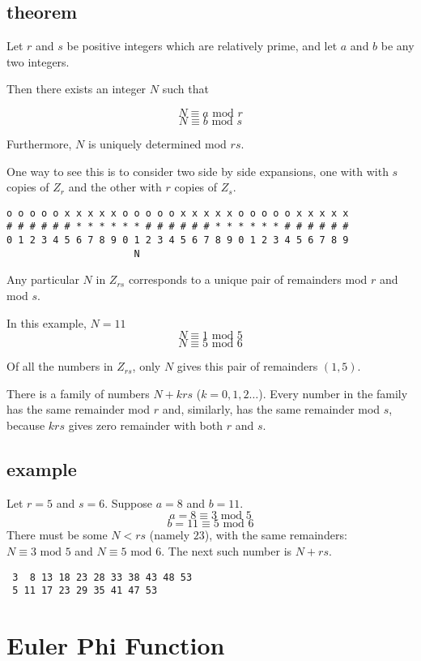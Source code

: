 \documentclass[11pt, oneside]{article}
\begin{document}
\subsection*{theorem}

Let $r$ and $s$ be positive integers which are relatively prime, and let $a$ and $b$ be any two integers.

Then there exists an integer $N$ such that

\[ N \equiv a \text{ mod } r \]
\[ N \equiv b \text{ mod } s \]

Furthermore, $N$ is uniquely determined mod $rs$.

One way to see this is to consider two side by side expansions, one with with $s$ copies of $Z_r$ and the other with $r$ copies of $Z_s$.

\begin{verbatim}
o o o o o x x x x x o o o o o x x x x x o o o o o x x x x x
# # # # # # * * * * * * # # # # # # * * * * * * # # # # # #
0 1 2 3 4 5 6 7 8 9 0 1 2 3 4 5 6 7 8 9 0 1 2 3 4 5 6 7 8 9 
                      N
\end{verbatim}

Any particular $N$ in $Z_{rs}$ corresponds to a unique pair of remainders mod $r$ and mod $s$. 

In this example, $N = 11$
\[ N \equiv 1 \text{ mod } 5 \]
\[ N \equiv 5 \text{ mod } 6 \]

Of all the numbers in $Z_{rs}$, only $N$ gives this pair of remainders $(1,5)$.

There is a family of numbers $N + krs$ ($ k = 0, 1, 2 \dots$).  Every number in the family has the same remainder mod $r$ and, similarly, has the same remainder mod $s$, because $krs$ gives zero remainder with both $r$ and $s$.

\subsection*{example}
Let $r = 5$ and $s = 6$.  Suppose $a = 8$ and $b = 11$.
\[ a = 8 \equiv 3 \text{ mod } 5 \]
\[ b = 11 \equiv 5 \text{ mod } 6 \]
There must be some $N < rs$ (namely $23$), with the same remainders:  $N \equiv 3 \text{ mod } 5$ and $N \equiv 5 \text{ mod } 6$.  The next such number is $N + rs$.
\begin{verbatim}
 3  8 13 18 23 28 33 38 43 48 53
 5 11 17 23 29 35 41 47 53
\end{verbatim}

\section*{Euler Phi Function}
\end{document}
